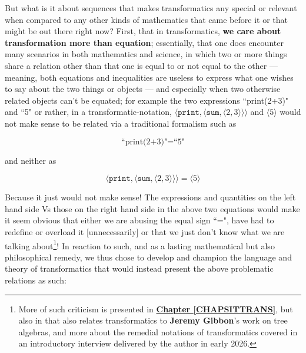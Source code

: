 \documentclass[a4paper, 18pt]{book} %
\begin{document}
\vspace{2em}

But what is it about sequences that makes transformatics any special or relevant when compared to any other kinds of mathematics that came before it or that might be out there right now? First, that in transformatics, \textbf{we care about transformation more than equation}; essentially, that one does encounter many scenarios in both mathematics and science, in which two or more things share a relation other than that one is equal to or not equal to the other --- meaning, both equations and inequalities are useless to express what one wishes to say about the two things or objects --- and especially when two otherwise related objects can't be equated; for example the two expressions ``print(2+3)" and ``5" or rather, in a transformatic-notation, $\langle \texttt{print}, \langle \texttt{sum}, \langle 2, 3 \rangle \rangle \rangle$ and $\langle 5 \rangle$ would not make sense to be related via a traditional formalism such as 

\vspace{1em}
\begin{equation}
\text{``print(2+3)"} = \text{``5"}
\end{equation}
\vspace{1em}


and neither as

\vspace{1em}
\begin{equation}
\langle \texttt{print}, \langle \texttt{sum}, \langle 2, 3 \rangle \rangle \rangle = \langle 5 \rangle
\end{equation}
\vspace{1em}

Because it just would not make sense! The expressions and quantities on the left hand side Vs those on the right hand side in the above two equations would make it seem obvious that either we are abusing the equal sign ``=", have had to redefine or overload it [unnecessarily] or that we just don't know what we are talking about\footnote{More of such criticism is presented in \textbf{\hyperref[CHAPSITTRANS]{Chapter \ref{CHAPSITTRANS}}}, but also in \cite{treealgebras_review} that also relates transformatics to \textbf{Jeremy Gibbon}'s work on tree algebras, and more about the remedial notations of transformatics covered in an introductory interview\cite{transformatics_interview} delivered by the author in early 2026.}! In reaction to such, and as a lasting mathematical but also philosophical remedy, we thus chose to develop and champion the language and theory of transformatics that would instead present the above problematic relations as such:
\end{document}
